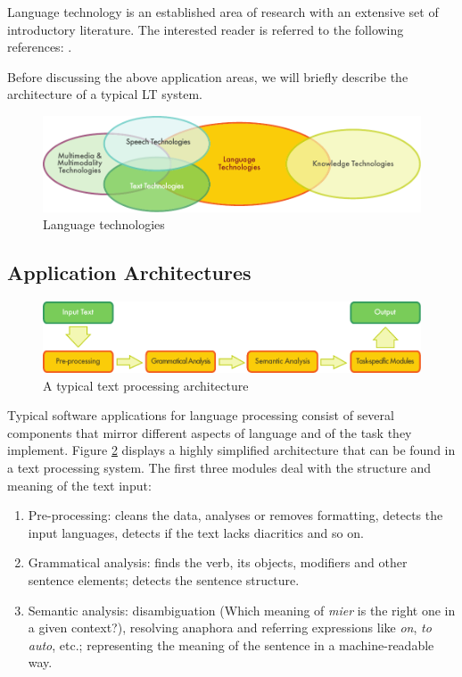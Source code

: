 \begin{multicols}{2}
Language technology is an established area of research with an extensive set of introductory literature. The interested reader is referred to the following references:  \cite{carstensen-etal1, jurafsky-martin01, manning-schuetze1, lt-world1, lt-survey1}.

Before discussing the above application areas, we will briefly describe the architecture of a typical LT system.

\begin{figure}[htb]
  \center
  \includegraphics[width=\textwidth]{../_media/english/language_technologies}
  \caption{Language technologies}
  \label{fig:ltincontexten}
\end{figure}

\subsection{Application Architectures}
\begin{figure}[hb]
  \center
  \includegraphics[width=\textwidth]{../_media/english/text_processing_app_architecture}
  \caption{A typical text processing architecture}
  \label{fig:textprocessingarch_en}
\end{figure}
Typical software applications for language processing consist of several components that mirror different aspects of language and of the task they implement. Figure \ref{fig:textprocessingarch_en} displays a highly simplified architecture that can be found in a text processing system. The first three modules deal with the structure and meaning of the text input:

\begin{enumerate}
\item Pre-processing: cleans the data, analyses or removes formatting, detects the input languages, detects if the text lacks diacritics and so on.
\item Grammatical analysis: finds the verb, its objects, modifiers and other sentence elements; detects the sentence structure.
\item Semantic analysis: disambiguation (Which meaning of \emph{mier} is the right one in a given context?), resolving anaphora and referring expressions like \emph{on}, \emph{to auto}, etc.; representing the meaning of the sentence in a machine-readable way.
\end{enumerate}


\end{multicols}
